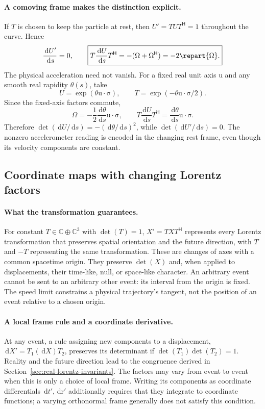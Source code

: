 \documentclass[11pt]{article}
\newcommand{\pv}[1]{{#1}}
\newcommand{\pvGreek}[1]{{#1}}
\newcommand{\vstyle}[1]{{\bm{\mathrm{#1}}}}
\newcommand{\pT}{\pv{T}}
\newcommand{\pU}{\pv{U}}
\newcommand{\pX}{\pv{X}}
\newcommand{\pvOmega}{\pvGreek{\Omega}}
\numberwithin{equation}{section}
\newcommand{\C}{\mathbb{C}}
\newcommand{\dotprod}{\cdot}
\newcommand{\bsig}{\vstyle{\sigma}}
\newcommand{\br}{\vstyle{r}}
\newcommand{\bu}{\vstyle{u}}
\newcommand{\dd}{\,\mathrm d}
\begin{document}
\paragraph{A comoving frame makes the distinction explicit.}
If $\pT$ is chosen to keep the particle at rest, then
$\pU'=\pT\pU\pT^{\mathsf H}=1$ throughout the curve. Hence
\[
 \frac{\dd\pU'}{\dd s}=0,\qquad
 \boxed{\pT\frac{\dd\pU}{\dd s}\pT^{\mathsf H}
 =-(\pvOmega+\pvOmega^{\mathsf H})=-2\repart{\pvOmega}.}
\]
The physical acceleration need not vanish. For a fixed real unit
axis $\bu$ and any smooth real rapidity $\theta(s)$, take
\[
 \pU=\exp(\theta\bu\dotprod\bsig),\qquad
 \pT=\exp(-\theta\bu\dotprod\bsig/2).
\]
Since the fixed-axis factors commute,
\[
 \pvOmega=-\frac12\frac{\dd\theta}{\dd s}\bu\dotprod\bsig,
 \qquad
 \pT\frac{\dd\pU}{\dd s}\pT^{\mathsf H}
 =\frac{\dd\theta}{\dd s}\bu\dotprod\bsig.
\]
Therefore $\det(\dd\pU/\dd s)=-(\dd\theta/\dd s)^2$, while
$\det(\dd\pU'/\dd s)=0$. The nonzero accelerometer reading is
encoded in the changing rest frame, even though its velocity
components are constant.

\subsection{Coordinate maps with changing Lorentz factors}
\label{sec:frame-second-derivative}

\paragraph{What the transformation guarantees.}
For constant $\pT\in\C\oplus\C^3$ with $\det(\pT)=1$,
$\pX'=\pT\pX\pT^{\mathsf H}$ represents every Lorentz transformation
that preserves spatial orientation and the future direction, with
$\pT$ and $-\pT$ representing the same transformation. These are
changes of axes with a common spacetime origin. They preserve
$\det(\pX)$ and, when applied to displacements, their time-like, null,
or space-like character. An arbitrary event cannot be sent to an
arbitrary other event: its interval from the origin is fixed.
The speed limit constrains a physical trajectory's tangent, not the
position of an event relative to a chosen origin.

\paragraph{A local frame rule and a coordinate derivative.}
At any event, a rule assigning new components to a displacement,
$\dd\pX'=\pT_1(\dd\pX)\pT_2$, preserves its determinant if
$\det(\pT_1)\det(\pT_2)=1$. Reality and the future direction
lead to the congruence derived in
Section~\ref{sec:real-lorentz-invariants}. The factors may vary from
event to event when this is only a choice of local frame.
Writing its components as coordinate differentials $\dd t',\dd\br'$
additionally requires that they integrate to coordinate functions;
a varying orthonormal frame generally does not satisfy this condition.
\end{document}
